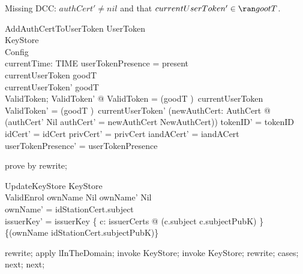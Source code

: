 Missing DCC: $authCert' \neq nil$ and that $currentUserToken' \in \ran gootT$.
\begin{schema}{AddAuthCertToUserToken}
  \Delta UserToken\\
  KeyStore\\
  Config\\
  currentTime: TIME
\where
  userTokenPresence = present\\
  currentUserToken \in  \ran  goodT\\
  currentUserToken' \in \ran goodT \\
  \exists  ValidToken; ValidToken' @ \theta  ValidToken = (goodT \inv)~currentUserToken \land  \theta  ValidToken' = (goodT \inv)~currentUserToken' \land
  			(\exists  newAuthCert: AuthCert @ (authCert' \neq Nil \land \The authCert' = newAuthCert \land  NewAuthCert)) \land  tokenID' = tokenID \land  idCert' = idCert \land  privCert' = privCert \land  iandACert' = iandACert\\
  userTokenPresence' = userTokenPresence
\end{schema}

\begin{zproof}
   prove by rewrite;
\end{zproof}

\begin{schema}{UpdateKeyStore}
  \Delta KeyStore\\
  ValidEnrol
\where
  ownName \neq Nil \land ownName' \neq Nil \\
  \The ownName' = idStationCert.subject\\
  issuerKey' = issuerKey \oplus  \{  c: issuerCerts @ (c.subject \mapsto  c.subjectPubK) \} \oplus  \{(\The ownName \mapsto  idStationCert.subjectPubK)\}
\end{schema}

\begin{zproof}
rewrite;
apply lInTheDomain;
invoke \Delta KeyStore;
invoke KeyStore;
rewrite;
cases;
next;
next;
\end{zproof}


